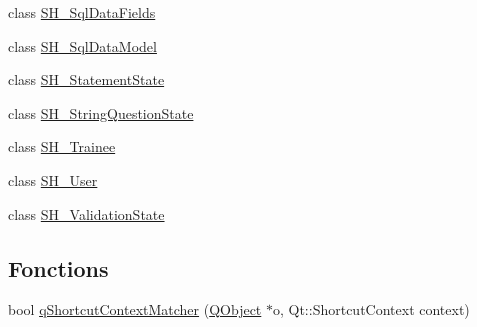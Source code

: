 \begin{DoxyCompactItemize}
class \hyperlink{classSimpleHotel_1_1SH__SqlDataFields}{S\-H\-\_\-\-Sql\-Data\-Fields}
\item 
class \hyperlink{classSimpleHotel_1_1SH__SqlDataModel}{S\-H\-\_\-\-Sql\-Data\-Model}
\item 
class \hyperlink{classSimpleHotel_1_1SH__StatementState}{S\-H\-\_\-\-Statement\-State}
\item 
class \hyperlink{classSimpleHotel_1_1SH__StringQuestionState}{S\-H\-\_\-\-String\-Question\-State}
\item 
class \hyperlink{classSimpleHotel_1_1SH__Trainee}{S\-H\-\_\-\-Trainee}
\item 
class \hyperlink{classSimpleHotel_1_1SH__User}{S\-H\-\_\-\-User}
\item 
class \hyperlink{classSimpleHotel_1_1SH__ValidationState}{S\-H\-\_\-\-Validation\-State}
\end{DoxyCompactItemize}
\subsection*{Fonctions}
\begin{DoxyCompactItemize}
\item 
bool \hyperlink{namespaceSimpleHotel_ac7d617d6f580fea4a2ca4e3ebbeadbcd}{q\-Shortcut\-Context\-Matcher} (\hyperlink{classQObject}{Q\-Object} $\ast$o, Qt\-::\-Shortcut\-Context context)
\end{DoxyCompactItemize}
